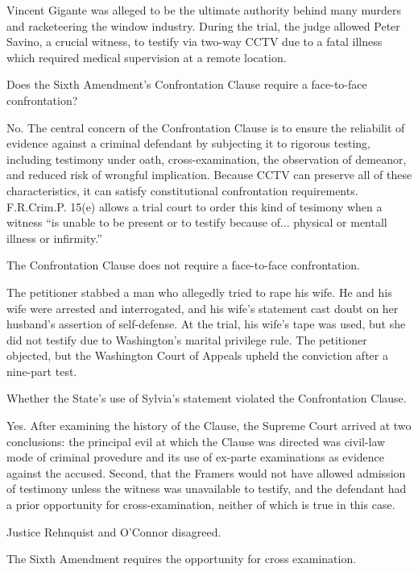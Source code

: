 \documentclass[paper=letter,fontsize=10pt]{article}
\newcommand{\case}[3]{\noindent {\large\textbf{\textit{#1}, #2 (#3)}} \par}
\begin{document}
	\begin{description}[align=right]
		\item[Facts] \noindent
			Vincent Gigante was alleged to be the ultimate authority behind many murders and racketeering the window industry. During the trial, the judge allowed Peter Savino, a crucial witness, to testify via two-way CCTV due to a fatal illness which required medical supervision at a remote location.
		\item[Issue] \noindent
			Does the Sixth Amendment’s Confrontation Clause require a face-to-face confrontation?
		\item[Holding] \noindent 
			No. The central concern of the Confrontation Clause is to ensure the reliabilit of evidence against a criminal defendant by subjecting it to rigorous testing, including testimony under oath, cross-examination, the observation of demeanor, and reduced risk of wrongful implication.
			Because CCTV can preserve all of these characteristics, it can satisfy constitutional confrontation requirements.
			F.R.Crim.P. 15(e) allows a trial court to order this kind of tesimony when a witness “is unable to be present or to testify because of... physical or mentall illness or infirmity.”
		\item[Rules] \noindent
			The Confrontation Clause does not require a face-to-face confrontation.
	\end{description}
\case{Crawford v. Washington}{541 U.S. 36}{2004}
	\begin{description}[align=right]
		\item[Facts] \noindent
			The petitioner stabbed a man who allegedly tried to rape his wife. He and his wife were arrested and interrogated, and his wife’s statement cast doubt on her husband’s assertion of self-defense.
			At the trial, his wife’s tape was used, but she did not testify due to Washington’s marital privilege rule.
			The petitioner objected, but the Washington Court of Appeals upheld the conviction after a nine-part test.
		\item[Issue] \noindent
			Whether the State’s use of Sylvia’s statement violated the Confrontation Clause.
		\item[Holding] \noindent 
			Yes. After examining the history of the Clause, the Supreme Court arrived at two conclusions: the principal evil at which the Clause was directed was civil-law mode of criminal provedure and its use of ex-parte examinations as evidence against the accused.
			Second, that the Framers would not have allowed admission of testimony unless the witness was unavailable to testify, and the defendant had a prior opportunity for cross-examination, neither of which is true in this case.
		\item[Dissent] \noindent
			Justice Rehnquist and O’Connor disagreed.
		\item[Rules] \noindent
			The Sixth Amendment requires the opportunity for cross examination.
	\end{description}
\end{document}
